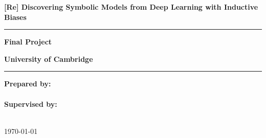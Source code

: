 \documentclass{article}
\begin{document}
\begin{titlepage}
    \centering
    
    \vspace*{\fill}
    
    \textbf{\LARGE [Re] Discovering Symbolic Models from Deep Learning with Inductive Biases}\\
    \vspace{0.5cm}
    \hrule %
    \vspace{0.5cm}
    \textbf{\Large Final Project}
    
    \vspace{3cm}
    
    \textbf{University of Cambridge}\\
    \hrule %
    \vspace{0.5cm}
    
    \vspace{0.5cm}
    
    \textbf{Prepared by:}\\
    \\
    \vspace{0.5cm}
    \textbf{Supervised by:}\\
    \\
    \vspace{0.5cm}
    \vspace{1cm}
    
    \today
    
    \vspace*{\fill}
\end{titlepage}

\newpage %
\end{document}
